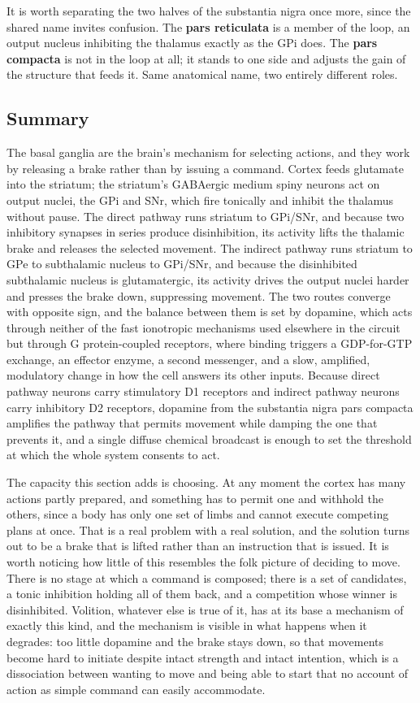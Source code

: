 \documentclass[11pt]{article}
\begin{document}
It is worth separating the two halves of the substantia nigra once more, since the shared name invites confusion. The \textbf{pars reticulata} is a member of the loop, an output nucleus inhibiting the thalamus exactly as the GPi does. The \textbf{pars compacta} is not in the loop at all; it stands to one side and adjusts the gain of the structure that feeds it. Same anatomical name, two entirely different roles.

\subsection{Summary}

The basal ganglia are the brain's mechanism for selecting actions, and they work by releasing a brake rather than by issuing a command. Cortex feeds glutamate into the striatum; the striatum's GABAergic medium spiny neurons act on output nuclei, the GPi and SNr, which fire tonically and inhibit the thalamus without pause. The direct pathway runs striatum to GPi/SNr, and because two inhibitory synapses in series produce disinhibition, its activity lifts the thalamic brake and releases the selected movement. The indirect pathway runs striatum to GPe to subthalamic nucleus to GPi/SNr, and because the disinhibited subthalamic nucleus is glutamatergic, its activity drives the output nuclei harder and presses the brake down, suppressing movement. The two routes converge with opposite sign, and the balance between them is set by dopamine, which acts through neither of the fast ionotropic mechanisms used elsewhere in the circuit but through G protein-coupled receptors, where binding triggers a GDP-for-GTP exchange, an effector enzyme, a second messenger, and a slow, amplified, modulatory change in how the cell answers its other inputs. Because direct pathway neurons carry stimulatory D1 receptors and indirect pathway neurons carry inhibitory D2 receptors, dopamine from the substantia nigra pars compacta amplifies the pathway that permits movement while damping the one that prevents it, and a single diffuse chemical broadcast is enough to set the threshold at which the whole system consents to act.

The capacity this section adds is choosing. At any moment the cortex has many actions partly prepared, and something has to permit one and withhold the others, since a body has only one set of limbs and cannot execute competing plans at once. That is a real problem with a real solution, and the solution turns out to be a brake that is lifted rather than an instruction that is issued. It is worth noticing how little of this resembles the folk picture of deciding to move. There is no stage at which a command is composed; there is a set of candidates, a tonic inhibition holding all of them back, and a competition whose winner is disinhibited. Volition, whatever else is true of it, has at its base a mechanism of exactly this kind, and the mechanism is visible in what happens when it degrades: too little dopamine and the brake stays down, so that movements become hard to initiate despite intact strength and intact intention, which is a dissociation between wanting to move and being able to start that no account of action as simple command can easily accommodate.
\end{document}

